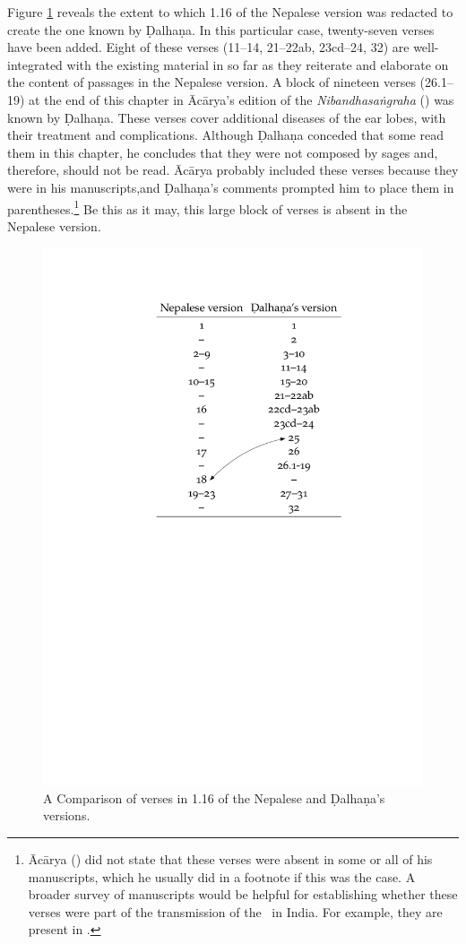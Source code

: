 Figure \ref{fig:chapters} reveals the extent to which 1.16 of the Nepalese version
was redacted to create the one known by Ḍalhaṇa. In this particular case,
twenty-seven verses have been added.  Eight of these verses (11--14, 21--22ab,
23cd--24, 32) are well-integrated with the existing material in so far as they
reiterate and elaborate on the content of passages in the Nepalese version. A
block of nineteen verses (26.1--19) at the end of this chapter in Ācārya's edition
of the \emph{Nibandhasaṅgraha} (\cite[80]{vulgate}) was known by Ḍalhaṇa. These
verses cover additional diseases of the ear lobes, with their treatment and
complications. Although Ḍalhaṇa conceded that some read them in this chapter, he
concludes that they were not composed by sages and, therefore, should not be read.
Ācārya probably included these verses because they were in his manuscripts,and
Ḍalhaṇa's comments prompted him to place them in parentheses.\footnote{Ācārya
    (\cite[80]{vulgate}) did not state that these verses were absent in some or all of
    his manuscripts, which he usually did in a footnote if this was the case. A
    broader survey of manuscripts would be helpful for establishing whether these
    verses were part of the transmission of the \SS\ in India. For example, they are
    present in .}  Be this as it may, this large
    block of verses is absent in the Nepalese version.  
\begin{figure}[t]
\centering
\includegraphics[draft=false,width=.75\textwidth]{media/table-of-versions.pdf}
\caption{A Comparison of verses in 1.16 of the Nepalese and Ḍalhaṇa's versions.}
\label{fig:chapters}
\end{figure}

